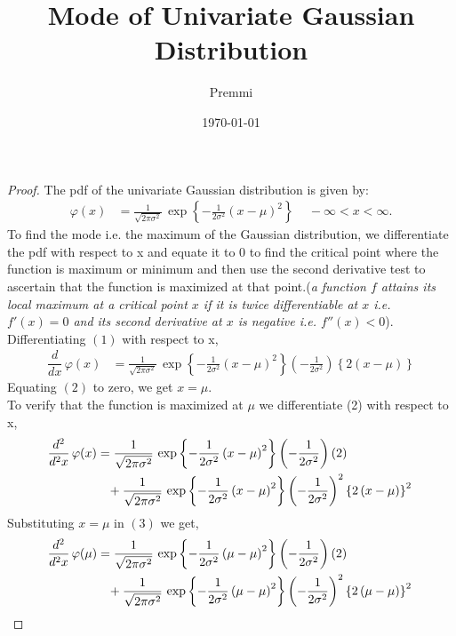 \documentclass[14pt]{extarticle}
\title{Mode of Univariate Gaussian Distribution}
\author{Premmi}
\date{\today}
\begin{document}
    
\maketitle
\begin{flushleft}	
\begin{proof} 
The pdf of the univariate Gaussian distribution is given by:
\begin{align}		
\varphi(x)&= \frac{1}{\sqrt{2\pi\sigma^2}}\, \exp\left\lbrace-\frac{1}{2\sigma^2}\left(x-\mu\right)^2\right\rbrace\,\,\,\,\,\,\,-\infty<x<\infty.		
\end{align}
To find the mode i.e. the maximum of the Gaussian distribution, we differentiate the pdf with respect to x and equate it to $0$ to find the critical point where the function is maximum or minimum and then use the second derivative test to ascertain that the function is maximized at that point.(\textit{a function $f$ attains its local maximum at a critical point $x$ if it is twice differentiable at $x$ i.e. $f'(x)=0$ and its second derivative at $x$ is negative i.e. $f''(x) < 0$}).\hfill \break
\hfill \break
Differentiating $(1)$ with respect to x,
\begin{align}
\dfrac{d}{dx}\,\varphi(x) &= \frac{1}{\sqrt{2\pi\sigma^2}}\, \exp\left\lbrace-\frac{1}{2\sigma^2}\left(x-\mu\right)^2\right\rbrace \left(-\frac{1}{2\sigma^2}\right) \left\lbrace2\left(x-\mu\right)\right\rbrace
\end{align}
Equating $(2)$ to zero, we get $x=\mu$.\\
\hfill \break
To verify that the function is maximized at $\mu$ we differentiate (2) with respect to x,
\begin{align}
\dfrac{d^2}{d^2x}\,\varphi(x) &= \frac{1}{\sqrt{2\pi\sigma^2}}\, \exp\left\lbrace-\frac{1}{2\sigma^2}\left(x-\mu\right)^2\right\rbrace \left(-\frac{1}{2\sigma^2}\right) \left(2\right) \\
& \,\,\,\,\,+ \frac{1}{\sqrt{2\pi\sigma^2}}\, \exp\left\lbrace-\frac{1}{2\sigma^2}\left(x-\mu\right)^2\right\rbrace \left(-\frac{1}{2\sigma^2}\right)^2 \left\lbrace2\left(x-\mu\right)\right\rbrace^2{\notag}
\end{align}
Substituting $x=\mu$ in $(3)$ we get,
\begin{align}
\dfrac{d^2}{d^2x}\,\varphi(\mu) &= \frac{1}{\sqrt{2\pi\sigma^2}}\, \exp\left\lbrace-\frac{1}{2\sigma^2}\left(\mu-\mu\right)^2\right\rbrace \left(-\frac{1}{2\sigma^2}\right) \left(2\right) \\
& \,\,\,\,\,+ \frac{1}{\sqrt{2\pi\sigma^2}}\, \exp\left\lbrace-\frac{1}{2\sigma^2}\left(\mu-\mu\right)^2\right\rbrace \left(-\frac{1}{2\sigma^2}\right)^2 \left\lbrace2\left(\mu-\mu\right)\right\rbrace^2{\notag}\\

\end{align}
\end{proof}
\end{flushleft}
\end{document}
